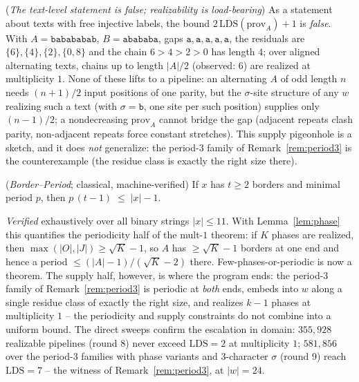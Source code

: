 \begin{remark}
    (\emph{The text-level statement is false; realizability is
    load-bearing})
    \label{rem:textlevel}
    As a statement about texts with free injective labels, the bound
    $2\,\mathrm{LDS}(\mathrm{prov}_A)+1$ is \emph{false}.  With $A =
    \mathtt{babababab}$, $B = \mathtt{abababa}$, gaps
    $\mathtt{a},\mathtt{a},\mathtt{a},\mathtt{a},\mathtt{a}$, the
    residuals are $\{6\},\{4\},\{2\},\{0,8\}$ and the chain $6 > 4 >
    2 > 0$ has length $4$; over aligned alternating texts, chains up
    to length $|A|/2$ (observed: $6$) are realized at multiplicity
    $1$.  None of these lifts to a pipeline: an alternating $A$ of
    odd length $n$ needs $(n{+}1)/2$ input positions of one parity,
    but the $\sigma$-site structure of any $w$ realizing such a text
    (with $\sigma = \mathtt{b}$, one site per such position) supplies
    only $(n{-}1)/2$; a nondecreasing $\mathrm{prov}_A$ cannot
    bridge the gap (adjacent repeats clash parity, non-adjacent
    repeats force constant stretches).  This supply pigeonhole is a
    sketch, and it does \emph{not} generalize: the period-$3$ family
    of Remark~\ref{rem:period3} is the counterexample (the residue
    class is exactly the right size there).
\end{remark}

\begin{lemma}
    (\emph{Border--Period}; classical, machine-verified)
    \label{lem:borderperiod}
    If $x$ has $t \geq 2$ borders and minimal period $p$, then
    $p\,(t-1) \;\leq\; |x| - 1$.
\end{lemma}

\noindent \emph{Verified} exhaustively over all binary strings $|x|
\leq 11$.  With Lemma~\ref{lem:phase} this quantifies the periodicity
half of the mult-$1$ theorem: if $K$ phases are realized, then
$\max(|O|, |J|) \geq \sqrt{K} - 1$, so $A$ has $\geq \sqrt{K}-1$
borders at one end and hence a period $\leq (|A|-1)/(\sqrt{K}-2)$
there.  Few-phases-or-periodic is now a theorem.  The supply half,
however, is where the program ends: the period-$3$ family of
Remark~\ref{rem:period3} is periodic at \emph{both} ends, embeds
into $w$ along a single residue class of exactly the right size, and
realizes $k-1$ phases at multiplicity $1$ -- the periodicity and
supply constraints do not combine into a uniform bound.  The direct
sweeps confirm the escalation in domain: $355{,}928$ realizable
pipelines (round 8) never exceed $\mathrm{LDS} = 2$ at multiplicity
$1$; $581{,}856$ over the period-$3$ families with phase variants and
3-character $\sigma$ (round 9) reach $\mathrm{LDS} = 7$ -- the
witness of Remark~\ref{rem:period3}, at $|w| = 24$.

